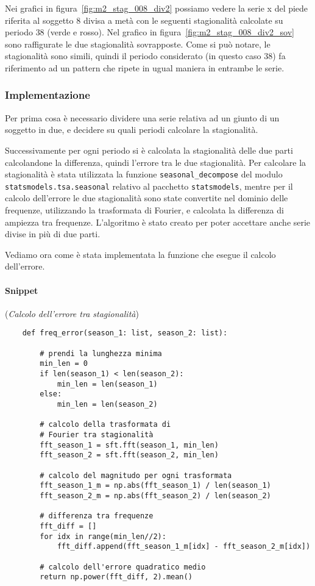 Nei grafici in figura~\ref{fig:m2_stag_008_div2} possiamo vedere la serie x del piede riferita al soggetto 
$8$ divisa a metà con le seguenti stagionalità calcolate su periodo $38$ (verde e rosso).
Nel grafico in figura~\ref{fig:m2_stag_008_div2_sov} sono raffigurate le due stagionalità
sovrapposte. Come si può notare, le stagionalità sono simili, quindi il periodo considerato
(in questo caso $38$) fa riferimento ad un pattern che ripete in ugual maniera in entrambe le serie.



\subsubsection{Implementazione}
Per prima cosa è necessario dividere una serie relativa ad un giunto di un soggetto in due, e decidere
su quali periodi calcolare la stagionalità.

\begin{sloppypar}
Successivamente per ogni periodo si è calcolata la stagionalità delle due parti
calcolandone la differenza, quindi l'errore tra le due stagionalità. Per calcolare la stagionalità
è stata utilizzata la funzione \texttt{seasonal\_decompose} del modulo \texttt{statsmodels.tsa.seasonal}
relativo al pacchetto \texttt{statsmodels}, mentre per il calcolo dell'errore
le due stagionalità sono state convertite nel dominio delle frequenze, utilizzando la trasformata
di Fourier, e calcolata la differenza di ampiezza tra frequenze. L'algoritmo è stato 
creato per poter accettare anche serie divise in più di due parti.
\end{sloppypar}

Vediamo ora come è stata implementata la funzione che esegue il calcolo dell'errore.

\paragraph*{Snippet} (\textit{Calcolo dell'errore tra stagionalità})
\begin{verbatim}
    def freq_error(season_1: list, season_2: list):

        # prendi la lunghezza minima 
        min_len = 0
        if len(season_1) < len(season_2):
            min_len = len(season_1)
        else:
            min_len = len(season_2)

        # calcolo della trasformata di 
        # Fourier tra stagionalità
        fft_season_1 = sft.fft(season_1, min_len)
        fft_season_2 = sft.fft(season_2, min_len)

        # calcolo del magnitudo per ogni trasformata
        fft_season_1_m = np.abs(fft_season_1) / len(season_1)
        fft_season_2_m = np.abs(fft_season_2) / len(season_2)

        # differenza tra frequenze
        fft_diff = []
        for idx in range(min_len//2):
            fft_diff.append(fft_season_1_m[idx] - fft_season_2_m[idx])
        
        # calcolo dell'errore quadratico medio
        return np.power(fft_diff, 2).mean() 
\end{verbatim}


